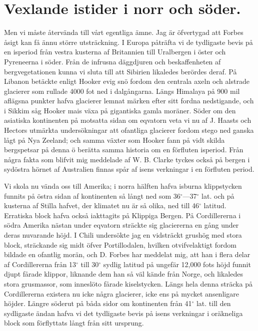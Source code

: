 \section{Vexlande istider i norr och söder.}

Men vi måste återvända till vårt egentliga ämne. Jag är öfvertygad att Forbes åsigt kan få ännu större utsträckning. I Europa påträfta vi de tydligaste bevis på en isperiod från vestra kusterna af Britannien till Uralbergen i öster och Pyreneerna i söder. Från de infrusna däggdjuren och beskaffenheten af bergvegetationen kunna vi sluta till att Sibirien likaledes berördes deraf. På Libanon betäckte enligt Hooker evig snö fordom den centrala axeln och alstrade glacierer som rullade 4000 fot ned i dalgångarna. Längs Himalaya på 900 mil aflägsna punkter hafva glacierer lemnat märken efter sitt fordna nedstigande, och i Sikkim såg Hooker mais växa på gigantiska gamla moräner. Söder om den asiatiska kontinenten på motsatta sidan om eqvatorn veta vi nu af J. Haasts och Hectors utmärkta undersökningar att ofantliga glacierer fordom stego ned ganska lågt på Nya Zeeland; och samma växter som Hooker fann på vidt skilda bergspetsar på denna ö berätta samma historia om en förfluten isperiod. Från några fakta som blifvit mig meddelade af W. B. Clarke tyckes också på bergen i sydöstra hörnet af Australien finnas spår af isens verkningar i en förfluten period.

Vi skola nu vända oss till Amerika; i norra hälften hafva isburna klippstycken funnits på östra sidan af kontinenten så långt ned som 36${}^\circ$—37${}^\circ$ lat. och på kusterna af Stilla hafvet, der klimatet nu är så olika, ned till 46${}^\circ$ latitud. Erratiska block hafva också iakttagits på Klippiga Bergen. På Cordillererna i södra Amerika nästan under eqvatorn sträckte sig glaciererna en gång under deras nuvarande höjd. I Chili undersökte jag en vidsträckt grushög med stora block, sträckande sig midt öfver Portillodalen, hvilken otvifvelaktigt fordom bildade en ofantlig morän, och D. Forbes har meddelat mig, att han i flera delar af Cordillererna från 13${}^\circ$ till 30${}^\circ$ sydlig latitud på ungefär 12,000 fots höjd funnit djupt fårade klippor, liknande dem han så väl kände från Norge, och likaledes stora grusmassor, som inneslöto fårade kiselstycken. Längs hela denna sträcka på Cordillererna existera nu icke några glacierer, icke ens på mycket ansenligare höjder. Längre söderut på båda sidor om kontinenten från 41${}^\circ$ lat. till den sydligaste ändan hafva vi det tydligaste bevis på isens verkningar i oräkneliga block som förflyttats långt från sitt ursprung.

